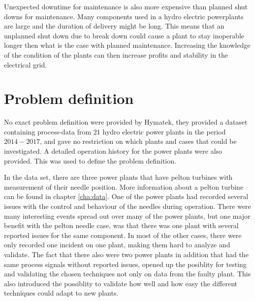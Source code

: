 Unexpected downtime for maintenance is also more expensive than planned shut downs for maintenance. Many components used in a hydro electric powerplants are large and the duration of delivery might be long. This means that an unplanned shut down due to break down could cause a plant to stay inoperable longer then what is the case with planned maintenance. Increasing the knowledge of the condition of the plants can then increase profits and stability in the electrical grid. 


\section{Problem definition}


No exact problem definition were provided by Hymatek, they provided a dataset containing process-data from $21$ hydro electric power plants in the period $2014-2017$, and gave no restriction on which plants and cases that could be investigated. A detailed operation history for the power plants were also provided. This was used to define the problem definition.  

In the data set, there are three power plants that have pelton turbines with measurement of their needle position. More information about a pelton turbine can be found in chapter \ref{cha:data}. One of the power plants had recorded several issues with the control and behaviour of the needles during operation. There were many interesting events spread out over many of the power plants, but one major benefit with the pelton needle case, was that there was one plant with several reported issues for the same component. In most of the other cases, there were only recorded one incident on one plant, making them hard to analyze and validate. The fact that there also were two power plants in addition that had the same process signals without reported issues, opened up the posiblity for testing and validating the chosen techniques not only on data from the faulty plant. This also introduced the possiblity to validate how well and how easy the different techniques could adapt to new plants.    

